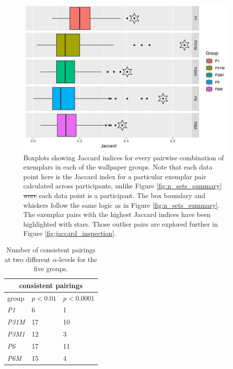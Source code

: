 \documentclass[11pt, twoside]{article}
\providecommand{\DIFaddtex}[1]{{\protect\color{blue}\uwave{#1}}} %
\providecommand{\DIFdeltex}[1]{{\protect\color{red}\sout{#1}}}                      %
\providecommand{\DIFaddbegin}{} %
\providecommand{\DIFaddend}{} %
\providecommand{\DIFdelbegin}{} %
\providecommand{\DIFdelend}{} %
\providecommand{\DIFaddFL}[1]{\DIFadd{#1}} %
\providecommand{\DIFdelFL}[1]{\DIFdel{#1}} %
\providecommand{\DIFaddbeginFL}{} %
\providecommand{\DIFaddendFL}{} %
\providecommand{\DIFdelbeginFL}{} %
\providecommand{\DIFdelendFL}{} %
\providecommand{\DIFadd}[1]{\texorpdfstring{\DIFaddtex{#1}}{#1}} %
\providecommand{\DIFdel}[1]{\texorpdfstring{\DIFdeltex{#1}}{}} %
\newcommand{\DIFscaledelfig}{0.5}
\newlength{\DIFdelgraphicswidth} %
\newlength{\DIFdelgraphicsheight} %
\newcommand{\DIFaddincludegraphics}[2][]{{\color{blue}\fbox{\DIFOincludegraphics[#1]{#2}}}} %
\newcommand{\DIFdelincludegraphics}[2][]{%
\sbox{\DIFdelgraphicsbox}{\DIFOincludegraphics[#1]{#2}}%
\settoboxwidth{\DIFdelgraphicswidth}{\DIFdelgraphicsbox} %
\settoboxtotalheight{\DIFdelgraphicsheight}{\DIFdelgraphicsbox} %
\scalebox{\DIFscaledelfig}{%
\parbox[b]{\DIFdelgraphicswidth}{\usebox{\DIFdelgraphicsbox}\\[-\baselineskip] \rule{\DIFdelgraphicswidth}{0em}}\llap{\resizebox{\DIFdelgraphicswidth}{\DIFdelgraphicsheight}{%
\setlength{\unitlength}{\DIFdelgraphicswidth}%
\begin{picture}(1,1)%
\thicklines\linethickness{2pt} %
{\color[rgb]{1,0,0}\put(0,0){\framebox(1,1){}}}%
{\color[rgb]{1,0,0}\put(0,0){\line( 1,1){1}}}%
{\color[rgb]{1,0,0}\put(0,1){\line(1,-1){1}}}%
\end{picture}%
}\hspace*{3pt}}} %
} %
\DeclareRobustCommand{\DIFaddbegin}{\DIFOaddbegin \let\includegraphics\DIFaddincludegraphics} %
\DeclareRobustCommand{\DIFaddend}{\DIFOaddend \let\includegraphics\DIFOincludegraphics} %
\DeclareRobustCommand{\DIFdelbegin}{\DIFOdelbegin \let\includegraphics\DIFdelincludegraphics} %
\DeclareRobustCommand{\DIFdelend}{\DIFOaddend \let\includegraphics\DIFOincludegraphics} %
\DeclareRobustCommand{\DIFaddbeginFL}{\DIFOaddbeginFL \let\includegraphics\DIFaddincludegraphics} %
\DeclareRobustCommand{\DIFaddendFL}{\DIFOaddendFL \let\includegraphics\DIFOincludegraphics} %
\DeclareRobustCommand{\DIFdelbeginFL}{\DIFOdelbeginFL \let\includegraphics\DIFdelincludegraphics} %
\DeclareRobustCommand{\DIFdelendFL}{\DIFOaddendFL \let\includegraphics\DIFOincludegraphics} %
\begin{document}
\DIFaddend \begin{figure}[t]
	\centering
	\includegraphics[width=\linewidth]{./figures/jaccard_summary.pdf}
	\caption{Boxplots showing Jaccard indices for every pairwise combination of exemplars in each of the wallpaper groups. Note that each data point here is the Jaccard index for a particular exemplar pair calculated across participants, unlike Figure \ref{fig:n_sets_summary} \DIFdelbeginFL \DIFdelFL{were }\DIFdelendFL \DIFaddbeginFL \DIFaddFL{where }\DIFaddendFL each data point is a participant. The box boundary and whiskers follow the same logic as in Figure \ref{fig:n_sets_summary}. The exemplar pairs with the highest Jaccard indices have been highlighted with stars. Those outlier pairs are explored further in Figure \ref{fig:jaccard_inspection}.}
	\label{fig:jaccard_summary}
\end{figure}

\DIFdelbegin %
\DIFdelend \DIFaddbegin \begin{table}[H]
	\DIFaddendFL \centering
	\begin{tabular}[t]{ |p{2cm}||p{2cm}|p{2cm}| }
		\hline
		\multicolumn{3}{|c|}{consistent pairings} \\
		\hline
		group & $p<0.01$ & $p<0.0001$ \\
		\hline
		\textit{P1}   & 6  & 1  \\
		\textit{P31M} & 17 & 10 \\
		\textit{P3M1} & 12 & 3  \\
		\textit{P6}   & 17 & 11 \\
		\textit{P6M}  & 15 & 4  \\
		\hline
	\end{tabular}
	\caption{Number of consistent pairings at two different $\alpha$-levels for the five groups.  }
	\label{table:pairings}
\DIFdelbeginFL %
\DIFdelendFL \DIFaddbeginFL \end{table}
\end{document}
